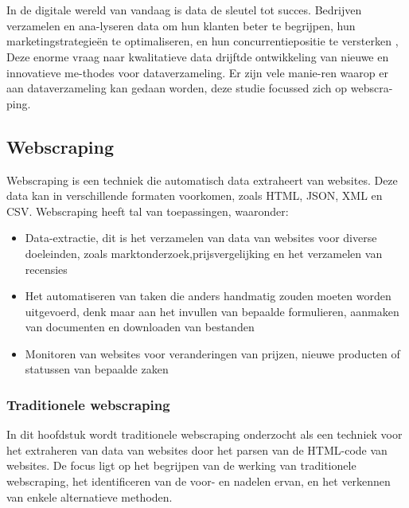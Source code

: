 \chapter{}%
\label{ch:stand-van-zaken}



In de digitale wereld van vandaag is data de sleutel tot succes. Bedrijven verzamelen en ana-lyseren data om hun klanten beter te begrijpen, hun marketingstrategieën te optimaliseren, en hun concurrentiepositie te versterken \autocite{},
Deze enorme vraag naar kwalitatieve data drijftde ontwikkeling van nieuwe en innovatieve me-thodes voor dataverzameling. Er zijn vele manie-ren waarop er aan dataverzameling kan gedaan worden, deze studie focussed zich op webscra-ping.

\section{Webscraping}
Webscraping is een techniek die automatisch
data extraheert van websites. Deze data kan in
verschillende formaten voorkomen, zoals HTML,
JSON, XML en CSV. Webscraping heeft tal van toepassingen,
waaronder:
\begin{itemize}
    \item Data-extractie, dit is het verzamelen van data van websites voor diverse doeleinden,
    zoals marktonderzoek,prijsvergelijking en het verzamelen van recensies
    \item Het automatiseren van taken die anders handmatig zouden moeten worden uitgevoerd, denk maar
    aan het invullen van bepaalde formulieren, aanmaken van documenten en downloaden van bestanden
    \item Monitoren van websites voor veranderingen van prijzen, nieuwe producten of statussen van bepaalde zaken
\end{itemize}

\subsection{Traditionele webscraping}

In dit hoofdstuk wordt traditionele webscraping  onderzocht als een techniek voor het extraheren van data van websites door het parsen van de HTML-code van websites. De focus ligt op het begrijpen van de werking van traditionele webscraping, het identificeren van de voor- en nadelen ervan, en het verkennen van enkele alternatieve methoden.

